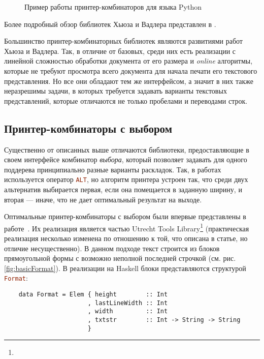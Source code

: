 \begin{figure}[h!]
	\centering
	\null\hfill
	\null\hfill
	\hfill\null
	\caption{Пример работы принтер-комбинаторов для языка Python}
  \label{fig:seqEx}	
\end{figure}

Более подробный обзор библиотек Хьюза и Вадлера представлен в \cite{myCoursePaper}.

Большинство принтер-комбинаторных библиотек\cite{
swierstraChitil, swierstra04, peytonJones, kiselyov, chitil}
являются развитиями работ Хьюза и Вадлера. Так, в отличие от базовых, среди
них есть реализации с линейной сложностью обработки документа от его размера и
\emph{online} алгоритмы, которые не требуют просмотра всего документа
для начала печати его текстового представления. Но все они обладают тем же
интерфейсом, а значит в них также неразрешимы задачи, в которых требуется
задавать варианты текстовых представлений, которые отличаются не только
пробелами и переводами строк.

\subsection{Принтер-комбинаторы с выбором}

Существенно от описанных выше отличаются библиотеки, предоставляющие в своем
интерфейсе комбинатор \emph{выбора}, который позволяет задавать для одного поддерева
принципиально разные варианты раскладок.
Так, в работах~\cite{jongeEveryOccasion, jongeReengine} используется
оператор \lstinline[language = Haskell]{ALT},
но алгоритм принтера устроен так, что среди двух альтернатив выбирается первая, если она
помещается в заданную ширину, и вторая --- иначе,
что не дает оптимальный результат на выходе.

Оптимальные принтер-комбинаторы с выбором были впервые представлены в работе~\cite{swierstra}.
Их реализация является частью Utrecht Tools
Library\footnote{}
(практическая реализация несколько изменена по
отношению к той, что описана в статье, но отличие несущественно).
В данном подходе текст строится из блоков прямоугольной формы с возможно неполной последней
строчкой (см. рис. \ref{fig:basicFormat}). В реализации на Haskell блоки представляются
структурой \lstinline[language = Haskell]{Format}:
\begin{lstlisting}
    data Format = Elem { height        :: Int
                       , lastLineWidth :: Int
                       , width         :: Int
                       , txtstr        :: Int -> String -> String
                       }
\end{lstlisting}

